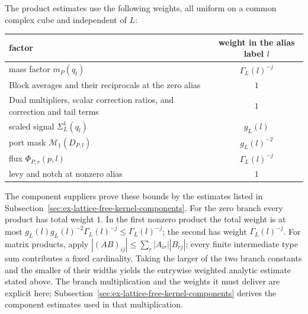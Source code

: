 The product estimates use the following weights, all uniform on a common
complex cube and independent of $L$:
\begin{center}
\begin{tabular}{p{.62\linewidth}|c}
factor & weight in the alias label $l$ \\
\hline
mass factor $m_P(q_l)$ & $\Gamma_L(l)^{-j}$ \\
Block averages and their reciprocals at the zero alias & $1$ \\
Dual multipliers, scalar correction ratios,
 and correction and tail terms & $1$ \\
 scaled signal $\Sigma_L^1(q_l)$ & $g_L(l)$ \\
 port mask $\mathcal M_1(D_{P,l})$ & $g_L(l)^{-2}$ \\
flux $\Phi_{P,r}(p,l)$ & $\Gamma_L(l)^{-j}$ \\
levy and notch at nonzero alias & $1$
\end{tabular}
\end{center}
The component suppliers prove these bounds by the estimates listed in
Subsection~\ref{sec:ex-lattice-free-kernel-components}. For the
zero branch every product has total weight $1$. In the first nonzero product
the total weight is at most
$g_L(l)g_L(l)^{-2}\Gamma_L(l)^{-j}
 \leq\Gamma_L(l)^{-j}$; the second has weight
$\Gamma_L(l)^{-j}$. For matrix products, apply
$|(AB)_{ij}|\leq\sum_r|A_{ir}||B_{rj}|$; every finite intermediate type
sum contributes a fixed cardinality. Taking the larger of the two branch
constants and the smaller of their widths yields the entrywise weighted
analytic estimate stated above. The branch multiplication and the weights it
must deliver are explicit here; Subsection~\ref{sec:ex-lattice-free-kernel-components}
derives the component estimates used in that multiplication.

